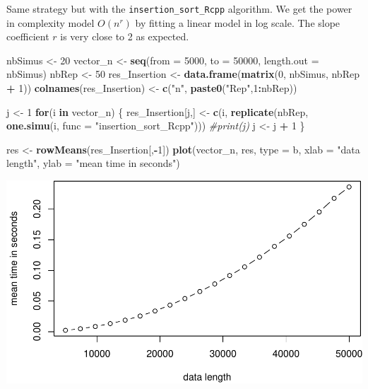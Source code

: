 \documentclass[
]{article}
\newenvironment{Shaded}{\begin{snugshade}}{\end{snugshade}}
\newcommand{\AttributeTok}[1]{\textcolor[rgb]{0.13,0.29,0.53}{#1}}
\newcommand{\CommentTok}[1]{\textcolor[rgb]{0.56,0.35,0.01}{\textit{#1}}}
\newcommand{\ControlFlowTok}[1]{\textcolor[rgb]{0.13,0.29,0.53}{\textbf{#1}}}
\newcommand{\DecValTok}[1]{\textcolor[rgb]{0.00,0.00,0.81}{#1}}
\newcommand{\FunctionTok}[1]{\textcolor[rgb]{0.13,0.29,0.53}{\textbf{#1}}}
\newcommand{\NormalTok}[1]{#1}
\newcommand{\OtherTok}[1]{\textcolor[rgb]{0.56,0.35,0.01}{#1}}
\newcommand{\SpecialCharTok}[1]{\textcolor[rgb]{0.81,0.36,0.00}{\textbf{#1}}}
\newcommand{\StringTok}[1]{\textcolor[rgb]{0.31,0.60,0.02}{#1}}
\begin{document}
Same strategy but with the \texttt{insertion\_sort\_Rcpp} algorithm. We
get the power in complexity model \(O(n^r)\) by fitting a linear model
in log scale. The slope coefficient \(r\) is very close to 2 as
expected.

\begin{Shaded}
\begin{Highlighting}[]
\NormalTok{nbSimus }\OtherTok{\textless{}{-}} \DecValTok{20}
\NormalTok{vector\_n }\OtherTok{\textless{}{-}} \FunctionTok{seq}\NormalTok{(}\AttributeTok{from =} \DecValTok{5000}\NormalTok{, }\AttributeTok{to =} \DecValTok{50000}\NormalTok{, }\AttributeTok{length.out =}\NormalTok{ nbSimus)}
\NormalTok{nbRep }\OtherTok{\textless{}{-}} \DecValTok{50}
\NormalTok{res\_Insertion }\OtherTok{\textless{}{-}} \FunctionTok{data.frame}\NormalTok{(}\FunctionTok{matrix}\NormalTok{(}\DecValTok{0}\NormalTok{, nbSimus, nbRep }\SpecialCharTok{+} \DecValTok{1}\NormalTok{))}
\FunctionTok{colnames}\NormalTok{(res\_Insertion) }\OtherTok{\textless{}{-}} \FunctionTok{c}\NormalTok{(}\StringTok{"n"}\NormalTok{, }\FunctionTok{paste0}\NormalTok{(}\StringTok{"Rep"}\NormalTok{,}\DecValTok{1}\SpecialCharTok{:}\NormalTok{nbRep))}

\NormalTok{j }\OtherTok{\textless{}{-}} \DecValTok{1}
\ControlFlowTok{for}\NormalTok{(i }\ControlFlowTok{in}\NormalTok{ vector\_n)}
\NormalTok{\{}
\NormalTok{  res\_Insertion[j,] }\OtherTok{\textless{}{-}} \FunctionTok{c}\NormalTok{(i, }\FunctionTok{replicate}\NormalTok{(nbRep, }\FunctionTok{one.simu}\NormalTok{(i, }\AttributeTok{func =} \StringTok{"insertion\_sort\_Rcpp"}\NormalTok{)))  }
  \CommentTok{\#print(j)}
\NormalTok{  j }\OtherTok{\textless{}{-}}\NormalTok{ j }\SpecialCharTok{+} \DecValTok{1}
\NormalTok{\}}

\NormalTok{res }\OtherTok{\textless{}{-}} \FunctionTok{rowMeans}\NormalTok{(res\_Insertion[,}\SpecialCharTok{{-}}\DecValTok{1}\NormalTok{])}
\FunctionTok{plot}\NormalTok{(vector\_n, res, }\AttributeTok{type =} \StringTok{\textquotesingle{}b\textquotesingle{}}\NormalTok{, }\AttributeTok{xlab =} \StringTok{"data length"}\NormalTok{, }\AttributeTok{ylab =} \StringTok{"mean time in seconds"}\NormalTok{)}
\end{Highlighting}
\end{Shaded}

\includegraphics{Sorting_analyse_files/figure-latex/unnamed-chunk-14-1.pdf}
\end{document}
